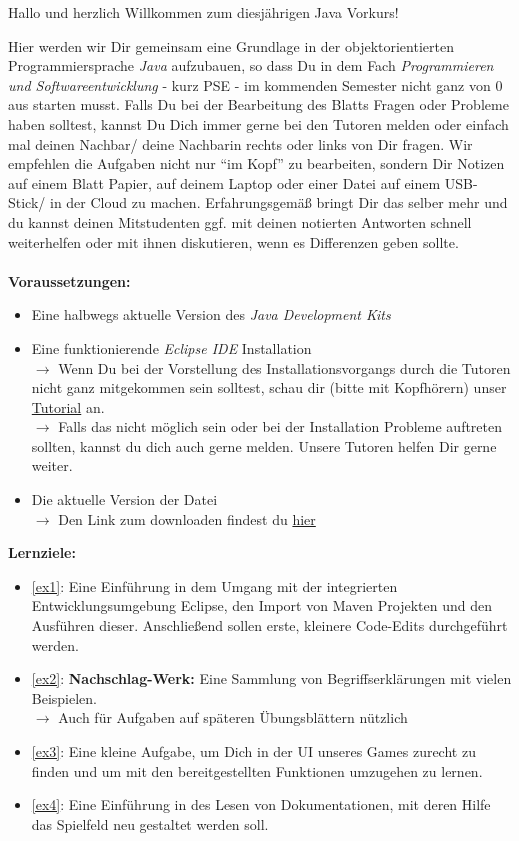 
\begin{center}
	Hallo und herzlich Willkommen zum diesjährigen Java Vorkurs!\\
\end{center}
Hier werden wir Dir gemeinsam eine Grundlage in der objektorientierten Programmiersprache \textit{Java} aufzubauen, so dass Du in dem Fach \textit{Programmieren und Softwareentwicklung} - kurz PSE - im kommenden Semester nicht ganz von 0 aus starten musst.\newline
Falls Du bei der Bearbeitung des Blatts Fragen oder Probleme haben solltest, kannst Du Dich immer gerne bei den Tutoren melden oder einfach mal deinen Nachbar/ deine Nachbarin rechts oder links von Dir fragen.\newline
Wir empfehlen die Aufgaben nicht nur \enquote{im Kopf} zu bearbeiten, sondern Dir Notizen auf einem Blatt Papier, auf deinem Laptop oder einer Datei auf einem USB-Stick/ in der Cloud zu machen. Erfahrungsgemäß bringt Dir das selber mehr und du kannst deinen Mitstudenten ggf. mit deinen notierten Antworten schnell weiterhelfen oder mit ihnen diskutieren, wenn es Differenzen geben sollte.\\\\
\textbf{Voraussetzungen:}
\begin{itemize}
	\item Eine halbwegs aktuelle Version des \textit{Java Development Kits}
	\item Eine funktionierende \textit{Eclipse IDE} Installation\\
	$\rightarrow$ Wenn Du bei der Vorstellung des Installationsvorgangs durch die Tutoren nicht ganz mitgekommen sein solltest, schau dir (bitte mit Kopfhörern) unser \href{\eclipseTutorial}{Tutorial} an.\\
	$\rightarrow$ Falls das nicht möglich sein oder bei der Installation Probleme auftreten sollten, kannst du dich auch gerne melden. Unsere Tutoren helfen Dir gerne weiter.
	\item Die aktuelle Version der \texttt{\jvkpackage} Datei\\
	$\rightarrow$ Den Link zum downloaden findest du \href{\jvkpackageurl}{hier}
\end{itemize}
\textbf{Lernziele:}
\begin{itemize}
	\item \ref{ex1}: Eine Einführung in dem Umgang mit der integrierten Entwicklungsumgebung Eclipse, den Import von Maven Projekten und den Ausführen dieser. Anschließend sollen erste, kleinere Code-Edits durchgeführt werden.
	\item \ref{ex2}: \textbf{Nachschlag-Werk:} Eine Sammlung von Begriffserklärungen mit vielen Beispielen.\\
	$\rightarrow$ Auch für Aufgaben auf späteren Übungsblättern nützlich
	\item \ref{ex3}: Eine kleine Aufgabe, um Dich in der UI unseres Games zurecht zu finden und um mit den bereitgestellten Funktionen umzugehen zu lernen.
	\item \ref{ex4}: Eine Einführung in des Lesen von Dokumentationen, mit deren Hilfe das Spielfeld neu gestaltet werden soll.
\end{itemize}